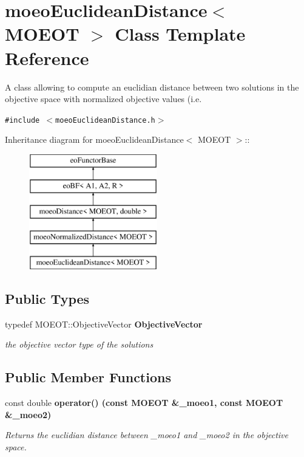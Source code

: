 \section{moeo\-Euclidean\-Distance$<$ MOEOT $>$ Class Template Reference}
\label{classmoeoEuclideanDistance}
A class allowing to compute an euclidian distance between two solutions in the objective space with normalized objective values (i.e.  


{\tt \#include $<$moeo\-Euclidean\-Distance.h$>$}

Inheritance diagram for moeo\-Euclidean\-Distance$<$ MOEOT $>$::\begin{figure}[H]
\begin{center}
\leavevmode
\includegraphics[height=5cm]{classmoeoEuclideanDistance}
\end{center}
\end{figure}
\subsection*{Public Types}
\begin{CompactItemize}
\item 
typedef MOEOT::Objective\-Vector \bf{Objective\-Vector}\label{classmoeoEuclideanDistance_d75b1b8695b3eb16f9574496b5822daa}

\begin{CompactList}\small\item\em the objective vector type of the solutions \item\end{CompactList}\end{CompactItemize}
\subsection*{Public Member Functions}
\begin{CompactItemize}
\item 
const double \bf{operator()} (const MOEOT \&\_\-moeo1, const MOEOT \&\_\-moeo2)
\begin{CompactList}\small\item\em Returns the euclidian distance between \_\-moeo1 and \_\-moeo2 in the objective space. \item\end{CompactList}\end{CompactItemize}



